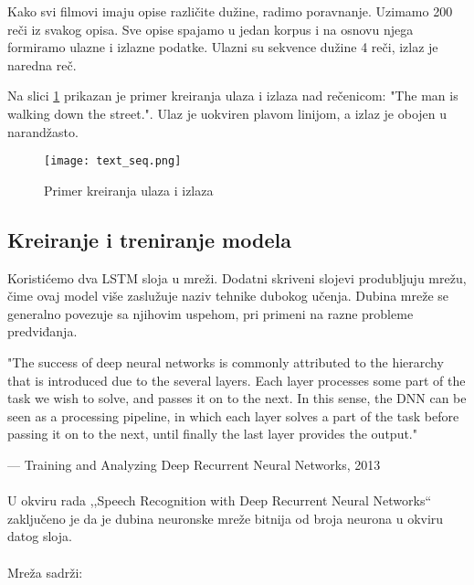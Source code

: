 \documentclass[a4paper]{article}
\begin{document}
Kako svi filmovi imaju opise različite dužine, radimo poravnanje. Uzimamo 200 reči iz svakog opisa. Sve opise spajamo u jedan korpus i na osnovu njega formiramo ulazne i izlazne podatke. Ulazni su sekvence dužine 4 reči, izlaz je naredna reč.

Na slici \ref{fig:text_seq} prikazan je primer kreiranja ulaza i izlaza nad rečenicom: "The man is walking down the street.". Ulaz je uokviren plavom linijom, a izlaz je obojen u narandžasto.


\begin{figure}[htp]
    \centering
    \texttt{[image: text\_seq.png]}
    \caption{Primer kreiranja ulaza i izlaza}
    \label{fig:text_seq}
\end{figure}


\subsection{Kreiranje i treniranje modela}

Koristićemo dva LSTM sloja u mreži. Dodatni skriveni slojevi produbljuju mrežu, čime ovaj model više zaslužuje naziv tehnike dubokog učenja. Dubina mreže se generalno povezuje sa njihovim uspehom, pri primeni na razne probleme predviđanja. 

"The success of deep neural networks is commonly attributed to the hierarchy that is introduced due to the several layers. Each layer processes some part of the task we wish to solve, and passes it on to the next. In this sense, the DNN can be seen as a processing pipeline, in which each layer solves a part of the task before passing it on to the next, until finally the last layer provides the output."

— Training and Analyzing Deep Recurrent Neural Networks, 2013  \cite{NIPS2013_5166}\\
\\
U okviru rada ,,Speech Recognition with Deep Recurrent Neural Networks`` \cite{graves2013speech} zaključeno je da je dubina neuronske mreže bitnija od broja neurona u okviru datog sloja.
\\
\\
Mreža sadrži:
\end{document}
